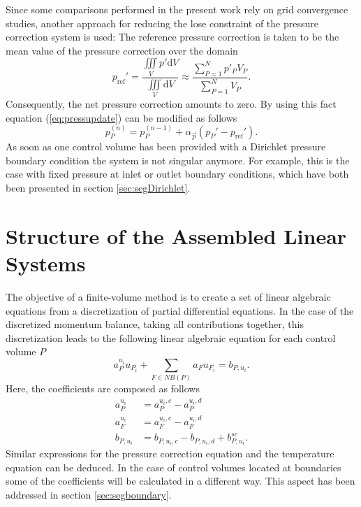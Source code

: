 Since some comparisons performed in the present work rely on grid convergence studies, another approach for reducing the lose constraint of the pressure correction system is used: The reference pressure correction is taken to be the mean value of the pressure correction over the domain 
\begin{displaymath}
  p_{\text{ref}}' 
  = \frac{\iiint\limits_V p' \mathrm{d}V}{\iiint\limits_V \mathrm{d}V} 
    \approx \frac{\sum_{P = 1}^N p'_P V_P}{\sum_{P = 1}^N V_P}.
\end{displaymath}
Consequently, the net pressure correction amounts to zero. By using this fact equation (\ref{eq:pressupdate}) can be modified as follows
\begin{displaymath}
  p_P^{(n)} = p_P^{(n-1)} + \alpha_{\vec{p}} \left( p_P' - p_{\text{ref}}' \right).
\end{displaymath}
As soon as one control volume has been provided with a Dirichlet pressure boundary condition the system is not singular anymore. For example, this is the case with fixed pressure at inlet or outlet boundary conditions, which have both been presented in section \ref{sec:segDirichlet}.

\section{Structure of the Assembled Linear Systems}
\label{sec:structure}

The objective of a finite-volume method is to create a set of linear algebraic equations from a discretization of partial differential equations. In the case of the discretized momentum balance, taking all contributions together, this discretization leads to the following linear algebraic equation for each control volume \(P\)
\begin{displaymath}
  a_P^{u_i} u_{P_i} + \sum_{F \in NB(P)} a_F u_{F_i} = b_{P,u_i}.
\end{displaymath}
Here, the coefficients are composed as follows
\begin{align*}
  a_P^{u_i} &= a_P^{u_i,c} - a_P^{u_i,d} \\
  a_F^{u_i} &= a_F^{u_i,c} - a_F^{u_i,d} \\
  b_{P,u_i} &= b_{P,u_i,c} - b_{P,u_i,d} + b_{P,u_i}^{sc}.
\end{align*}
Similar expressions for the pressure correction equation and the temperature equation can be deduced. In the case of control volumes located at boundaries some of the coefficients will be calculated in a different way. This aspect has been addressed in section \ref{sec:segboundary}.

